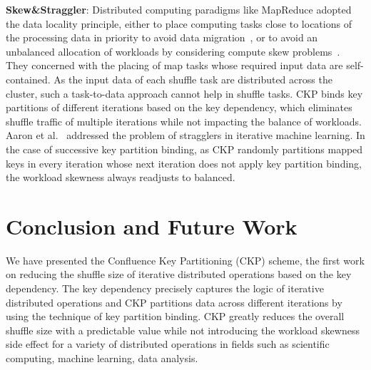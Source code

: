 \documentclass[10pt,journal,compsoc]{IEEEtran}
\begin{document}
\textbf{Skew\&Straggler}: 
Distributed computing paradigms like MapReduce adopted the data locality principle, either to place computing tasks close to locations of the processing data in priority to avoid data migration~\cite{dean2008mapreduce, zaharia2008improving}, or to avoid an unbalanced allocation of workloads by considering compute skew problems~\cite{kwon2010skew, kwon2012skewtune}. 
They concerned with the placing of map tasks whose required input data are self-contained.
As the input data of each shuffle task are distributed across the cluster, such a task-to-data approach cannot help in shuffle tasks. 
CKP binds key partitions of different iterations based on the key dependency, which eliminates shuffle traffic of multiple iterations while not impacting the balance of workloads.
Aaron et al.~\cite{Harlap:2016:ASP} addressed the problem of stragglers in iterative machine learning. 
In the case of successive key partition binding,
as CKP randomly partitions mapped keys in every iteration 
whose next iteration does not apply key partition binding, 
the workload skewness always readjusts to balanced. 



\section{Conclusion and Future Work}\label{section:conclusion}
We have presented the Confluence Key Partitioning (CKP) scheme, the first work on reducing the shuffle size of
iterative distributed operations based on the key dependency. 
The key dependency precisely captures the logic of iterative distributed operations and CKP partitions data across different iterations by using the technique of key partition binding.
CKP greatly reduces the overall shuffle size with a predictable value 
while not introducing the workload skewness side effect 
for a variety of distributed operations
in fields such as scientific computing, machine learning, data
analysis.
\end{document}
